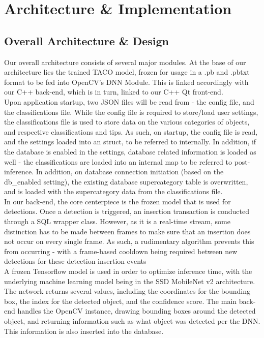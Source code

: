 \documentclass[conference]{IEEEtran}
\begin{document}
\newpage
\section{Architecture & Implementation}
\subsection{Overall Architecture & Design}
Our overall architecture consists of several major modules. At the base of our architecture lies the trained TACO model, frozen for usage in a .pb and .pbtxt format to be fed into OpenCV's DNN Module. This is linked accordingly with our C++ back-end, which is in turn, linked to our C++ Qt front-end.\\

Upon application startup, two JSON files will be read from - the config file, and the classifications file. While the config file is required to store/load user settings, the classifications file is used to store data on the various categories of objects, and respective classifications and tips. As such, on startup, the config file is read, and the settings loaded into an struct, to be referred to internally. In addition, if the database is enabled in the settings, database related information is loaded as well - the classifications are loaded into an internal map to be referred to post-inference. In addition, on database connection initiation (based on the db\_enabled setting), the existing database supercategory table is overwritten, and is loaded with the supercategory data from the classifications file.\\

In our back-end, the core centerpiece is the frozen model that is used for detections. Once a detection is triggered, an insertion transaction is conducted through a SQL wrapper class. However, as it is a real-time stream, some distinction has to be made between frames to make sure that an insertion does not occur on every single frame. As such, a rudimentary algorithm prevents this from occurring - with a frame-based cooldown being required between new detections for these detection insertion events\\

A frozen Tensorflow model is used in order to optimize inference time, with the underlying machine learning model being in the SSD MobileNet v2 architecture. The network returns several values, including the coordinates for the bounding box, the index for the detected object, and the confidence score. The main back-end handles the OpenCV instance, drawing bounding boxes around the detected object, and returning information such as what object was detected per the DNN. This information is also inserted into the database.\\
\end{document}
